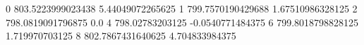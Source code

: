 0 803.5223999023438 5.44049072265625
1 799.7570190429688 1.67510986328125
2 798.0819091796875 0.0
4 798.02783203125 -0.0540771484375
6 799.8018798828125 1.719970703125
8 802.7867431640625 4.704833984375
